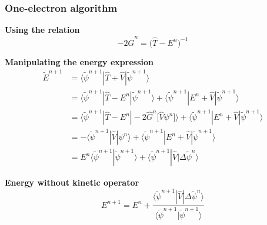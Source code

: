 \begin{frame}
    \frametitle{One-electron algorithm}
    \centering
    \textbf{Using the relation}
    \begin{equation}
        \nonumber
        -2\hat{G}^n = \big(\hat{T} - E^n\big)^{-1}
    \end{equation}

    \vspace{5mm}

    \textbf{Manipulating the energy expression}
    \begin{align}
        \tilde{E}^{n+1}
        \nonumber
        &=	\langle\tilde{\psi}^{n+1}| \hat{T}+\hat{V} | \tilde{\psi}^{n+1}\rangle\\
        \nonumber
        &=	\langle\tilde{\psi}^{n+1}|  \hat{T} - E^n  | \tilde{\psi}^{n+1}\rangle
        +	\langle\tilde{\psi}^{n+1}|  E^n + \hat{V}  | \tilde{\psi}^{n+1}\rangle\\
        \nonumber
        &=	\langle\tilde{\psi}^{n+1}|  \hat{T} - E^n  | 
	        -2\hat{G}^n\big[\hat{V}\psi^n\big]\rangle
        +	\langle\tilde{\psi}^{n+1}| E^n + \hat{V} |\tilde{\psi}^{n+1}\rangle\\
        \nonumber
        &= -\langle\tilde{\psi}^{n+1}| \hat{V} |\psi^{n}\rangle
        +	\langle\tilde{\psi}^{n+1}| E^n + \hat{V} |\tilde{\psi}^{n+1}\rangle\\
        \nonumber
        &= E^{n}\langle\tilde{\psi}^{n+1}|\tilde{\psi}^{n+1}\rangle + 
	    \langle\tilde{\psi}^{n+1}| \hat{V} |\Delta\tilde{\psi}^{n}\rangle
    \end{align}

    \vspace{8mm}

    \centering
    \textbf{Energy without kinetic operator}
    \begin{equation}
        \nonumber
        E^{n+1} = E^{n} + 
        \frac{\langle\tilde{\psi}^{n+1}| \hat{V} |\Delta\tilde{\psi}^{n}\rangle}
        {\langle\tilde{\psi}^{n+1}|\tilde{\psi}^{n+1}\rangle}
    \end{equation}
\end{frame}

